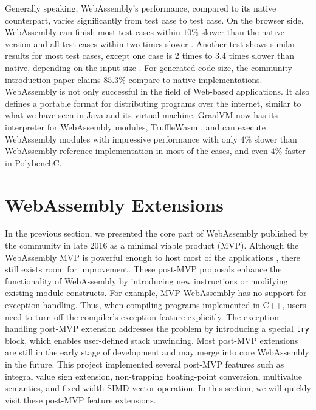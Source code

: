 Generally speaking, WebAssembly's performance, compared to its native
counterpart, varies significantly from test case to test case. On the browser
side, WebAssembly can finish most test cases within $10\%$ slower than the
native version and all test cases within two times slower
\cite{10.1145/3062341.3062363}. Another test shows similar results for most
test cases, except one case is $2$ times to $3.4$ times slower than native,
depending on the input size \cite{234914}. For generated code size, the
community introduction paper claims $85.3\%$ compare to native implementations.
WebAssembly is not only successful in the field of Web-based applications. It
also defines a portable format for distributing programs over the internet,
similar to what we have seen in Java and its virtual machine. GraalVM now has
its interpreter for WebAssembly modules, TruffleWasm \cite{trufflewasm}, and can
execute WebAssembly modules with impressive performance with only $4\%$ slower
than WebAssembly reference implementation in most of the cases, and even $4\%$
faster in PolybenchC.

\section{WebAssembly Extensions}

In the previous section, we presented the core part of WebAssembly published by
the community in late 2016 as a minimal viable product (MVP). Although the
WebAssembly MVP is powerful enough to host most of the applications
\cite{webassembly-survey}, there still exists room for improvement. These
post-MVP proposals enhance the functionality of WebAssembly by introducing new
instructions or modifying existing module constructs. For example, MVP
WebAssembly has no support for exception handling. Thus, when compiling programs
implemented in C++, users need to turn off the compiler's exception
feature explicitly. The exception handling post-MVP extension addresses the
problem by introducing a special \texttt{try} block, which enables user-defined
stack unwinding. Most post-MVP extensions are still in the early stage of
development and may merge into core WebAssembly in the future. This project
implemented several post-MVP features such as integral value sign extension,
non-trapping floating-point conversion, multivalue semantics, and fixed-width
SIMD vector operation. In this section, we will quickly visit these post-MVP
feature extensions.

